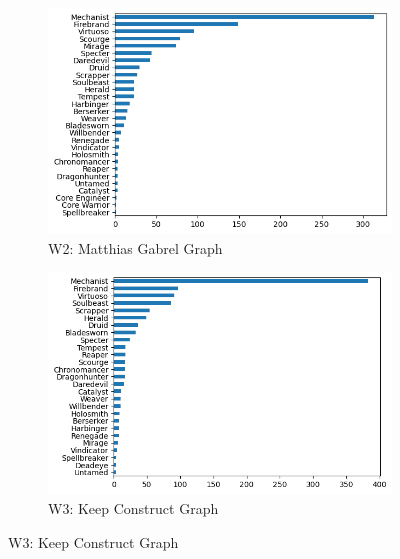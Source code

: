 \documentclass[12pt,a4paper]{article}
\begin{document}
\begin{figure}[h!]
        \begin{subfigure}{0.5\textwidth}
            \centering
            \includegraphics[scale=0.4]{matt_graph.png}
            \caption{\small W2: Matthias Gabrel Graph}
        \end{subfigure}%
        \begin{subfigure}{0.5\textwidth}
            \centering
            \includegraphics[scale=0.4]{kc_graph.png}
            \caption{\small W3: Keep Construct Graph}
        \end{subfigure}


\end{figure}
\end{document}
